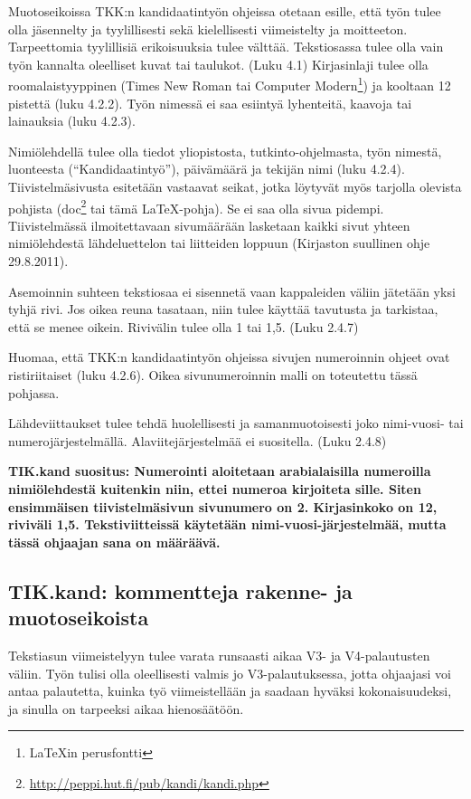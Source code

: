 Muotoseikoissa TKK:n kandidaatintyön ohjeissa otetaan esille, että
työn tulee olla jäsennelty ja tyylillisesti sekä kielellisesti
viimeistelty ja moitteeton.  Tarpeettomia tyylillisiä erikoisuuksia
tulee välttää.  Tekstiosassa tulee olla vain työn kannalta oleelliset
kuvat tai taulukot. (Luku 4.1)
%
Kirjasinlaji tulee olla roomalaistyyppinen (Times New Roman
tai Computer Modern\footnote{\LaTeX{}in perusfontti}) ja kooltaan 12 pistettä
(luku 4.2.2). 
%
Työn nimessä ei saa esiintyä lyhenteitä, kaavoja tai lainauksia
(luku 4.2.3).

Nimiölehdellä tulee olla tiedot yliopistosta, tutkinto-ohjelmasta,
työn nimestä, luonteesta (``Kandidaatintyö''), päivämäärä ja tekijän
nimi (luku 4.2.4). Tiivistelmäsivusta esitetään vastaavat seikat,
jotka löytyvät myös tarjolla olevista pohjista
(doc\footnote{\url{http://peppi.hut.fi/pub/kandi/kandi.php}} tai tämä
\LaTeX{}-pohja).  Se ei saa olla sivua pidempi. 
Tiivistelmässä
ilmoitettavaan sivumäärään lasketaan kaikki sivut yhteen 
nimiölehdestä lähdeluettelon tai liitteiden loppuun
(Kirjaston suullinen ohje 29.8.2011). 

Asemoinnin suhteen tekstiosaa ei sisennetä vaan kappaleiden väliin
jätetään yksi tyhjä rivi. Jos oikea reuna tasataan, niin tulee käyttää
tavutusta ja tarkistaa, että se menee oikein.  Rivivälin tulee olla 1
tai 1,5. (Luku 2.4.7)

Huomaa, että TKK:n kandidaatintyön ohjeissa sivujen numeroinnin ohjeet
ovat ristiriitaiset (luku 4.2.6). Oikea sivunumeroinnin malli on
toteutettu tässä pohjassa.  

Lähdeviittaukset tulee tehdä huolellisesti ja samanmuotoisesti joko
nimi-vuosi- tai numerojärjestelmällä. Alaviitejärjestelmää ei
suositella. (Luku 2.4.8)

\textbf{TIK.kand suositus: Numerointi aloitetaan arabialaisilla
  numeroilla nimiölehdestä kuitenkin niin, ettei numeroa kirjoiteta
  sille. Siten ensimmäisen tiivistelmäsivun sivunumero on 2. 
  Kirjasinkoko on 12, riviväli 1,5. Tekstiviitteissä käytetään
  nimi-vuosi-järjestelmää, mutta tässä ohjaajan sana on määräävä.}

\subsection{TIK.kand: kommentteja rakenne- ja muotoseikoista}

Tekstiasun viimeistelyyn tulee varata runsaasti aikaa V3- ja
V4-palautusten väliin. Työn tulisi olla oleellisesti valmis jo
V3-palautuksessa, jotta ohjaajasi voi antaa palautetta, kuinka työ
viimeistellään ja saadaan hyväksi kokonaisuudeksi, ja sinulla on 
tarpeeksi aikaa hienosäätöön.

